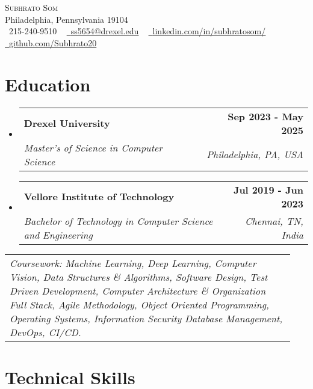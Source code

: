 \documentclass[letterpaper,11pt]{article}
\makeatletter
\newcommand{\resumeSubheading}[4]{
  \vspace{-2pt}\item
    \begin{tabular*}{1.0\textwidth}[t]{l@{\extracolsep{\fill}}r}
      \textbf{#1} & \textbf{\small #2} \\
      \textit{\small#3} & \textit{\small #4} \\
    \end{tabular*}\vspace{-7pt}
}
\newcommand{\resumeSubHeadingListStart}{\begin{itemize}[leftmargin=0.0in, label={}]}
\newcommand{\resumeSubHeadingListEnd}{\end{itemize}}
\makeatother
\begin{document}

\vspace{-16pt}
\begin{center}
    {\Huge \scshape Subhrato Som} \\ \vspace{1pt}
    Philadelphia, Pennsylvania 19104 \\ \vspace{1pt}
    \small \raisebox{-0.1\height}\faPhone\ 215-240-9510 ~ \href{mailto:ss5654@drexel.edu}{\raisebox{-0.2\height}\faEnvelope\  \underline{ss5654@drexel.edu}} ~ 
    \href{https://linkedin.com/in/subhratosom/}{\raisebox{-0.2\height}\faLinkedin\ \underline{linkedin.com/in/subhratosom/}}  ~
    \href{https://github.com/Subhrato20}{\raisebox{-0.2\height}\faGithub\ \underline{github.com/Subhrato20}}
    \vspace{-8pt}
\end{center}

\section{Education}
  \resumeSubHeadingListStart
  
    \resumeSubheading
      {Drexel University}{Sep 2023 - May 2025}
      {Master's of Science in Computer Science}{Philadelphia, PA, USA}

    \vspace{-5pt}
    \resumeSubheading
      {Vellore Institute of Technology}{Jul 2019 - Jun 2023}
      {Bachelor of Technology in Computer Science and Engineering}{Chennai, TN, India}
  
  \resumeSubHeadingListEnd
  \vspace{0.2em}
    \hspace{0.15in}\begin{tabular}{p{0.94\linewidth}}
    \textit{{Coursework}: Machine Learning, Deep Learning, Computer Vision, Data Structures \& Algorithms, Software Design, Test Driven Development, Computer Architecture \& Organization Full Stack, Agile Methodology, Object Oriented Programming, Operating Systems, Information Security Database Management, DevOps, CI/CD.}
\end{tabular}

\section{Technical Skills}
\end{document}

